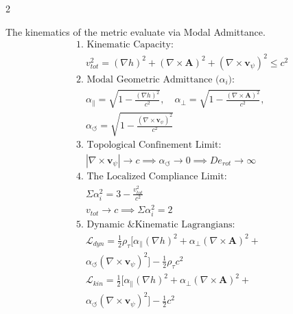 \documentclass[11pt, a4paper]{article}
\newcounter{cheatnum}
\begin{document}
\begin{multicols}{2}
\begin{tcolorbox}[cheatbox, title={\refstepcounter{cheatnum}\label{box:unified_lagrangian}\thecheatnum. The Unified Fluid Lagrangian \& Modal Admittance \scriptsize\hfill\hyperref[sec:deriv_unified_lagrangian]{[Proof $\downarrow$]}}]
The kinematics of the metric evaluate via Modal Admittance.
\begin{align}
    &\text{1. Kinematic Capacity:} \nonumber \\
    &\quad v_{tot}^2 = (\nabla h)^2 + (\nabla \times \mathbf{A})^2 + (\nabla \times \mathbf{v}_{\psi})^2 \le c^2 \label{eq:absolute_pythagorean_constraint} \\
    &\text{2. Modal Geometric Admittance ($\alpha_{i}$):} \nonumber \\
    &\quad \alpha_{\parallel} = \sqrt{1 - \frac{(\nabla h)^2}{c^2}}, \quad \alpha_{\perp} = \sqrt{1 - \frac{(\nabla \times \mathbf{A})^2}{c^2}}, \nonumber \\ 
    &\quad \alpha_{\circlearrowleft} = \sqrt{1 - \frac{(\nabla \times \mathbf{v}_{\psi})^2}{c^2}} \label{eq:modal_admittance} \\
    &\text{3. Topological Confinement Limit:} \nonumber \\
    &\quad |\nabla \times \mathbf{v}_{\psi}| \to c \implies \alpha_{\circlearrowleft} \to 0 \implies De_{rot} \to \infty \label{eq:deborah_rotational} \\
    &\text{4. The Localized Compliance Limit:} \nonumber \\
    &\quad \Sigma \alpha_i^2 = 3 - \frac{v_{tot}^2}{c^2} \label{eq:compliance_sum} \\
    &\quad v_{tot} \to c \implies \Sigma \alpha_i^2 = 2 \label{eq:absolute_compliance_state} \\
    &\text{5. Dynamic \& Kinematic Lagrangians:} \nonumber \\
    &\quad \mathcal{L}_{dyn} = \frac{1}{2} \rho_{\tau} \Big[ \alpha_{\parallel}(\nabla h)^2 + \alpha_{\perp}(\nabla \times \mathbf{A})^2 + \nonumber \\
    &\quad \alpha_{\circlearrowleft}(\nabla \times \mathbf{v}_{\psi})^2 \Big] - \frac{1}{2} \rho_{\tau} c^2 \label{eq:modal_lagrangian} \\
    &\quad \mathcal{L}_{kin} = \frac{1}{2} \Big[ \alpha_{\parallel}(\nabla h)^2 + \alpha_{\perp}(\nabla \times \mathbf{A})^2 + \nonumber \\
    &\quad \alpha_{\circlearrowleft}(\nabla \times \mathbf{v}_{\psi})^2 \Big] - \frac{1}{2} c^2 \label{eq:kinematic_lagrangian} \\

\end{align}
\end{tcolorbox}
\end{multicols}
\end{document}
